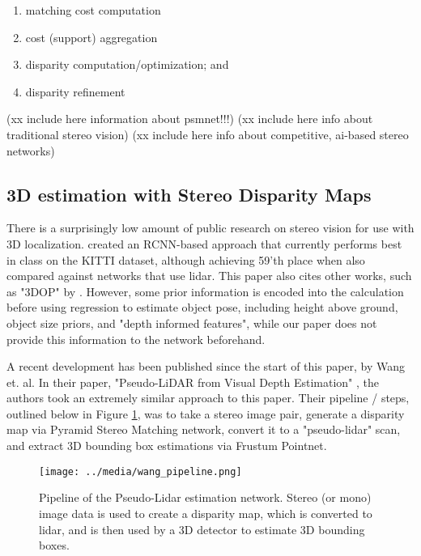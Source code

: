\begin{enumerate} \itemsep=-0.5em
    \item matching cost computation
    \item cost (support) aggregation
    \item disparity computation/optimization; and
    \item disparity refinement
    
\end{enumerate}

(xx include here information about psmnet!!!)
(xx include here info about traditional stereo vision)
(xx include here info about competitive, ai-based stereo networks)




\subsection{3D estimation with Stereo Disparity Maps}
There is a surprisingly low amount of public research on stereo vision for use with 3D localization. \cite{li_stereo_2019} created an RCNN-based approach that currently performs best in class on the KITTI dataset, although achieving 59'th place when also compared against networks that use lidar. This paper also cites other works, such as "3DOP" by \cite{chen_3d_2016}. However, some prior information is encoded into the calculation before using regression to estimate object pose, including height above ground, object size priors, and "depth informed features", while our paper does not provide this information to the network beforehand.

A recent development has been published since the start of this paper, by Wang et. al. In their paper, "Pseudo-LiDAR from Visual Depth Estimation" \cite{wang_pseudo-lidar_2019}, the authors took an extremely similar approach to this paper. Their pipeline / steps, outlined below in Figure \ref{wang_pipeline}, was to take a stereo image pair, generate a disparity map via Pyramid Stereo Matching network, convert it to a "pseudo-lidar" scan, and extract 3D bounding box estimations via Frustum Pointnet. \\

\begin{figure}[ht] %
    \texttt{[image: ../media/wang\_pipeline.png]}
    \caption{Pipeline of the Pseudo-Lidar estimation network. Stereo (or mono) image data is used to create a disparity map, which is converted to lidar, and is then used by a 3D detector to estimate 3D bounding boxes.}
    \label{wang_pipeline} %
\end{figure}

